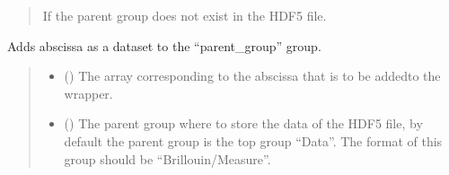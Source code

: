 \documentclass[letterpaper,10pt,english]{sphinxmanual}
\begin{document}
\begin{fulllineitems}
\begin{fulllineitems}
\begin{quote}
\begin{description}
\begin{itemize}
\end{itemize}

\sphinxAtStartPar
{} \textendash{} If the parent group does not exist in the HDF5 file.

\end{description}\end{quote}

\end{fulllineitems}


\begin{fulllineitems}
\label{\detokenize{_autosummary/HDF5_BLS.wrapper:HDF5_BLS.wrapper.Wrapper.add_abscissa}}
\pysigstartsignatures
\pysiglinewithargsret
{}
{\sphinxparamcomma {}\sphinxparamcomma {}\sphinxparamcomma {}\sphinxparamcomma {}\sphinxparamcomma {}\sphinxparamcomma {}}
{}
\pysigstopsignatures
\sphinxAtStartPar
Adds abscissa as a dataset to the “parent\_group” group.
\begin{quote}\begin{description}
\begin{itemize}
\item {} 
\sphinxAtStartPar
{} () \textendash{} The array corresponding to the abscissa that is to be addedto the wrapper.

\item {} 
\sphinxAtStartPar
{} (\sphinxstyleliteralemphasis{\sphinxupquote{, }}) \textendash{} The parent group where to store the data of the HDF5 file, by default the parent group is the top group “Data”. The format of this group should be “Brillouin/Measure”.


\end{itemize}
\end{description}
\end{quote}
\end{fulllineitems}
\end{fulllineitems}
\end{document}
